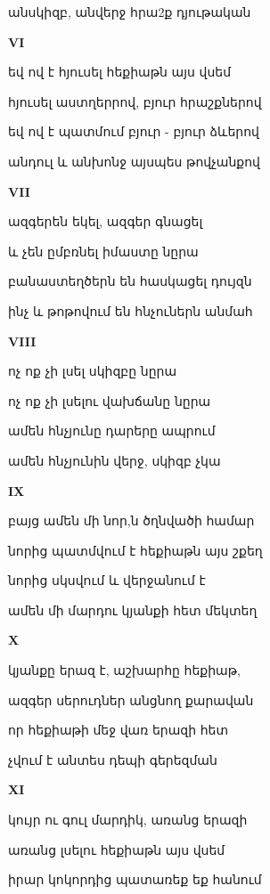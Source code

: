 անսկիզբ, անվերջ հրա2ք     դյութական



\centerline {\bf  VI}



    եվ ով է հյուսել հեքիաթն այս վսեմ 



   հյուսել աստղերրով, բյուր հրաշքներով



   եվ ով է պատմում բյուր - բյուր ձևերով


  անդուլ և անխոնջ այսպես   թովչանքով 

\centerline {\bf VII}


ազգերեն եկել, ազգեր գնացել



և չեն ըմբռնել իմաստը նըրա


 բանաստեղծերն են հասկացել դույզն


   ինչ և թոթովում  են հնչուներն անմահ  


\centerline {\bf VIII}

ոչ ոք չի լսել սկիզբը նըրա 




ոչ ոք չի լսելու վախճանը նըրա




ամեն հնչյունը դարերը ապրում



ամեն հնչյունին վերջ, սկիզբ չկա





\centerline {\bf IX}  
բայց ամեն մի  նոր,ն  ծղնվածի համար


նորից  պատմվում է հեքիաթն այս շքեղ

նորից սկսվում և  վերջանում է  



ամեն մի մարդու  կյանքի հետ մեկտեղ 



\centerline  {\bf X}



կյանքը երազ է, աշխարհը հեքիաթ, 

 
ազգեր սերուդներ անցնող քարավան


որ հեքիաթի մեջ վառ երազի հետ


չվում է անտես դեպի գերեզման


\centerline {\bf XI }
 
կույր ու գուլ  մարդիկ, առանց երազի

առանց լսելու հեքիաթն  այս վսեմ


իրար կոկորդից պատառեք եք հանում


